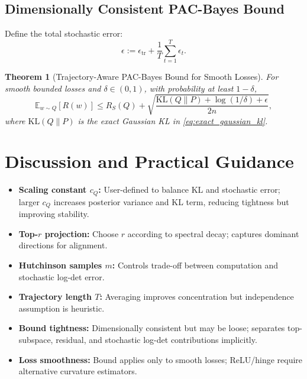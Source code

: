\documentclass[11pt]{article}
\newtheorem{theorem}{Theorem}[section]
\begin{document}
\subsection{Dimensionally Consistent PAC-Bayes Bound}
Define the total stochastic error:
\[
\epsilon := \epsilon_{\mathrm{tr}} + \frac{1}{T} \sum_{t=1}^T \epsilon_t.
\]

\begin{theorem}[Trajectory-Aware PAC-Bayes Bound for Smooth Losses]
For smooth bounded losses and $\delta \in (0,1)$, with probability at least $1-\delta$,
\begin{equation}
\mathbb{E}_{w\sim Q}[R(w)] \le R_S(Q) + \sqrt{\frac{ \mathrm{KL}(Q\|P) + \log(1/\delta) + \epsilon}{2n}},
\end{equation}
where $\mathrm{KL}(Q\|P)$ is the exact Gaussian KL in \eqref{eq:exact_gaussian_kl}.
\end{theorem}

\section{Discussion and Practical Guidance}
\begin{itemize}[noitemsep]
    \item \textbf{Scaling constant $c_Q$:} User-defined to balance KL and stochastic error; larger $c_Q$ increases posterior variance and KL term, reducing tightness but improving stability.
    \item \textbf{Top-$r$ projection:} Choose $r$ according to spectral decay; captures dominant directions for alignment.
    \item \textbf{Hutchinson samples $m$:} Controls trade-off between computation and stochastic log-det error.
    \item \textbf{Trajectory length $T$:} Averaging improves concentration but independence assumption is heuristic.
    \item \textbf{Bound tightness:} Dimensionally consistent but may be loose; separates top-subspace, residual, and stochastic log-det contributions implicitly.
    \item \textbf{Loss smoothness:} Bound applies only to smooth losses; ReLU/hinge require alternative curvature estimators.
\end{itemize}
\end{document}
